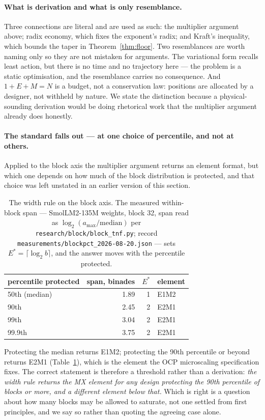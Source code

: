 \documentclass[11pt]{article}
\theoremstyle{definition}
\begin{document}
\paragraph{What is derivation and what is only resemblance.} Three connections are
literal and are used as such: the multiplier argument above; radix economy, which
fixes the exponent's radix; and Kraft's inequality, which bounds the taper in
Theorem~\ref{thm:floor}. Two resemblances are worth naming only so they are not
mistaken for arguments. The variational form recalls least action, but there is no
time and no trajectory here --- the problem is a static optimisation, and the
resemblance carries no consequence. And $1+E+M=N$ is a budget, not a conservation
law: positions are allocated by a designer, not withheld by nature. We state the
distinction because a physical-sounding derivation would be doing rhetorical work
that the multiplier argument already does honestly.

\paragraph{The standard falls out --- at one choice of percentile, and not at
others.} Applied to the block axis the multiplier argument returns an element
format, but which one depends on how much of the block distribution is protected,
and that choice was left unstated in an earlier version of this section.

\begin{table}[t]\centering
\caption{The width rule on the block axis. The measured within-block span ---
SmolLM2-135M weights, block 32, span read as $\log_2(a_{\max}/\mathrm{median})$
per \texttt{research/block/block\_tnf.py}; record
\texttt{measurements/blockpct\_2026-08-20.json} --- sets
$E^{*} = \lceil \log_2 b \rceil$, and the answer moves with the percentile
protected.}
\label{tab:blockpct}
\begin{tabular}{lrrl}
\toprule
percentile protected & span, binades & $E^{*}$ & element \\
\midrule
50th (median) & 1.89 & 1 & E1M2 \\
90th & 2.45 & 2 & E2M1 \\
99th & 3.04 & 2 & E2M1 \\
99.9th & 3.75 & 2 & E2M1 \\
\bottomrule
\end{tabular}
\end{table}

Protecting the median returns E1M2; protecting the 90th percentile or beyond
returns E2M1 (Table~\ref{tab:blockpct}), which is the element the OCP microscaling
specification fixes. The
correct statement is therefore a threshold rather than a derivation: \emph{the
width rule returns the MX element for any design protecting the 90th percentile
of blocks or more, and a different element below that.} Which is right is a
question about how many blocks may be allowed to saturate, not one settled from
first principles, and we say so rather than quoting the agreeing case alone.
\end{document}
